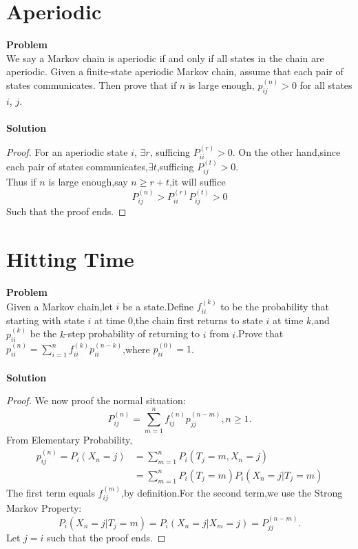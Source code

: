 	\section{Aperiodic}
	\textbf{Problem}\\
	We say a Markov chain is aperiodic if and only if all states in the chain are aperiodic. Given a finite-state aperiodic Markov chain, assume that each pair of states communicates. Then prove that if $n$ is large enough, $p^{(n)}_{ij} > 0$ for all states $i$, $j$.\\\\
	\textbf{Solution}\\
	\begin{proof}
		For an aperiodic state $i$, $\exists  r$, sufficing $P^{(r)}_{ii}>0$. On the other hand,since each pair of states communicates,$\exists t$,sufficing $P^{(t)}_{ij} > 0$.\\
	Thus if $n$ is large enough,say $n \geq r + t$,it will suffice
	\[
	P^{(n)}_{ij}>P^{(r)}_{ii} P^{(t)}_{ij}>0
	\]
	Such that the proof ends.
	\end{proof}
	
	\section{Hitting Time}
	\textbf{Problem}\\
	Given a Markov chain,let $i$ be a state.Define $f^{(k)}_{ii}$ to be the probability that starting with state $i$ at time 0,the chain first returns to state $i$ at time $k$,and $p^{(k)}_{ii}$ be the $k$-step probability of returning to $i$ from $i$.Prove that $p^{(n)}_{ii}=\sum_{i=1}^{n}f^{(k)}_{ii}p^{(n-k)}_{ii}$,where $p^{(0)}_{ii}=1$.\\\\
	\textbf{Solution}\\
	\begin{proof}
		We now proof the normal situation:
	\[
	P^{(n)}_{ij}=\sum_{m = 1}^{n}f^{(n)}_{ij}p^{(n-m)}_{jj},n \geq 1.
	\]
	From Elementary Probability,
	\begin{equation*}
	\begin{split}
	p^{(n)}_{ij}=P_i(X_n=j) &=\sum_{m = 1}^{n}P_i(T_j = m,X_n = j)\\
	&=\sum_{m = 1}^{n}P_i(T_j=m)P_i(X_n=j|T_j=m)
	\end{split}
	\end{equation*}
	The first term equals $f^{(m)}_{ij}$,by definition.For the second term,we use the Strong Markov Property:
	\[
	P_i(X_n = j|T_j = m) = P_i(X_n = j|X_m = j)=P^{(n-m)}_{jj}.
	\]
	Let $j = i$ such that the proof ends.
	\end{proof}
	
